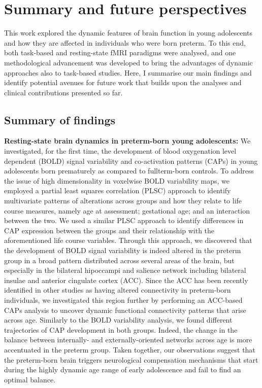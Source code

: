 \chapter{Summary and future perspectives}\label{chapter:ch6}

This work explored the dynamic features of brain function in young adolescents and how they are affected in individuals who were born preterm. To this end, both task-based and resting-state fMRI paradigms were analysed, and one methodological advancement was developed to bring the advantages of dynamic approaches also to task-based studies. Here, I summarise our main findings and identify potential avenues for future work that builds upon the analyses and clinical contributions presented so far. 

\section{Summary of findings}

\textbf{Resting-state brain dynamics in preterm-born young adolescents:} We investigated, for the first time, the development of blood oxygenation level dependent (BOLD) signal variability and co-activation patterns (CAPs) in young adolescents born prematurely as compared to fullterm-born controls. To address the issue of high dimensionality in voxelwise BOLD variability maps, we employed a partial least squares correlation (PLSC) approach to identify multivariate patterns of alterations across groups and how they relate to life course measures, namely age at assessment; gestational age; and an interaction between the two. We used a similar PLSC approach to identify differences in CAP expression between the groups and their relationship with the aforementioned life course variables. Through this approach, we discovered that the development of BOLD signal variability is indeed altered in the preterm group in a broad pattern distributed across several areas of the brain, but especially in the bilateral hipoccampi and salience network including bilateral insulae and anterior cingulate cortex (ACC). Since the ACC has been recently identified in other studies as having altered connectivity in preterm-born individuals, we investigated this region further by performing an ACC-based CAPs analysis to uncover dynamic functional connectivity patterns that arise across age. Similarly to the BOLD variability analysis, we found different trajectories of CAP development in both groups.  Indeed, the change in the balance between  internally- and externally-oriented networks across age is more accentuated in the preterm group. Taken together, our observations suggest that the preterm-born brain triggers neurological compensation mechanisms that start during the highly dynamic age range of early adolescence and fail to find an optimal balance.


